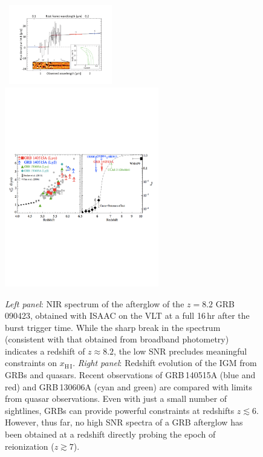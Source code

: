 \documentclass[letterpaper,11pt]{article}
\begin{document}
\begin{figure}[tp!]
\begin{center}
\hbox{
\includegraphics[width=0.4\textwidth]{figures/Slide1.pdf}
\includegraphics[width=0.6\textwidth]{figures/GRB140515A.pdf}
}
\vspace{-1.0cm}
\end{center}
\caption{\footnotesize
{{\it Left panel}: NIR spectrum of the afterglow of the $z = 8.2$ 
GRB\,090423\cite{tfl+09}, obtained with ISAAC on the VLT at a full 16\,hr
after the burst trigger time.  While the sharp break in the spectrum (consistent
with that obtained from broadband photometry) indicates a redshift of $z \approx
8.2$, the low SNR precludes meaningful constraints on $x_{\mathrm{H\,I}}$.
{\it Right panel}: Redshift evolution of the IGM from GRBs and quasars.  
  Recent observations of GRB\,140515A (blue and red\cite{cbf+14}) and
  GRB\,130606A (cyan and green\cite{cbf+13}) are compared with limits
  from quasar observations.  Even with just a small number of sightlines, 
  GRBs can provide powerful constraints at redshifts $z \lesssim 6$.
 However, thus far, no high SNR spectra of a GRB
afterglow has been obtained at a redshift directly probing the epoch 
of reionization ($z \gtrsim 7$).}}
\end{figure}
\end{document}
